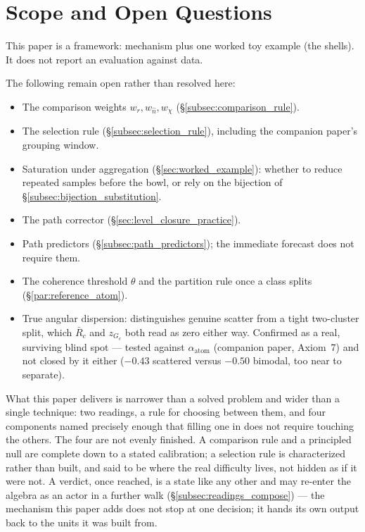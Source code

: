 \documentclass[12pt, a4paper]{article}
\begin{document}
\section{Scope and Open Questions}
\label{sec:scope}

This paper is a framework: mechanism plus one worked toy example
(the shells). It does not report an evaluation against data.

The following remain open rather than resolved here:

\begin{itemize}
\item The comparison weights $w_r,w_{\hat n},w_\chi$
      (\S\ref{subsec:comparison_rule}).
\item The selection rule (\S\ref{subsec:selection_rule}), including
      the companion paper's grouping window.
\item Saturation under aggregation (\S\ref{sec:worked_example}):
      whether to reduce repeated samples before the bowl, or rely on
      the bijection of \S\ref{subsec:bijection_substitution}.
\item The path corrector (\S\ref{sec:level_closure_practice}).
\item Path predictors (\S\ref{subsec:path_predictors}); the immediate
      forecast does not require them.
\item The coherence threshold $\theta$ and the partition rule once a
      class splits (\S\ref{par:reference_atom}).
\item True angular dispersion: distinguishes genuine scatter from a
      tight two-cluster split, which $\bar R_c$ and $z_{G_c}$ both
      read as zero either way. Confirmed as a real, surviving blind
      spot --- tested against $\alpha_{\text{atom}}$ (companion
      paper, Axiom~7) and not closed by it either ($-0.43$ scattered
      versus $-0.50$ bimodal, too near to separate).
\end{itemize}

What this paper delivers is narrower than a solved problem and wider
than a single technique: two readings, a rule for choosing between
them, and four components named precisely enough that filling one in
does not require touching the others. The four are not evenly
finished. A comparison rule and a principled null are complete down
to a stated calibration; a selection rule is characterized rather
than built, and said to be where the real difficulty lives, not
hidden as if it were not. A verdict, once reached, is a state like
any other and may re-enter the algebra as an actor in a further
walk (\S\ref{subsec:readings_compose}) --- the mechanism this paper
adds does not stop at one decision; it hands its own output back to
the units it was built from.
\end{document}
